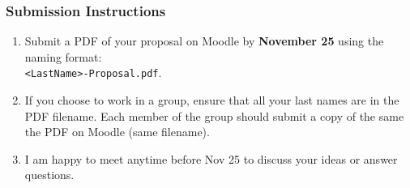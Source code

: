 \documentclass[11pt,twoside]{article}
\makeatletter
\newenvironment{exercise}{\@startsection 
	{section}
	{1}
	{-.2em}
	{-3.5ex plus -1ex minus -.2ex}
    	{1.3ex plus .2ex}
    	{\pagebreak[3]%
	\large\bf\noindent{Part 1.\hspace{-1.5ex} }
	}
	}
\newcommand{\?}{\stackrel{?}{=}}
\makeatother
\begin{document}


  


\subsubsection*{Submission Instructions}
\begin{enumerate}
\item Submit a PDF of your proposal on Moodle by \textbf{November 25} using the naming format:\\ \texttt{<LastName>-Proposal.pdf}.
\item If you choose to work in a group, ensure that all your last names are in the PDF filename. Each member of the group should  submit
  a copy of the same the PDF on  Moodle (same filename).  
\item I am happy to meet anytime before Nov 25 to discuss your ideas or answer questions. 
\end{enumerate}
 
\end{document}
